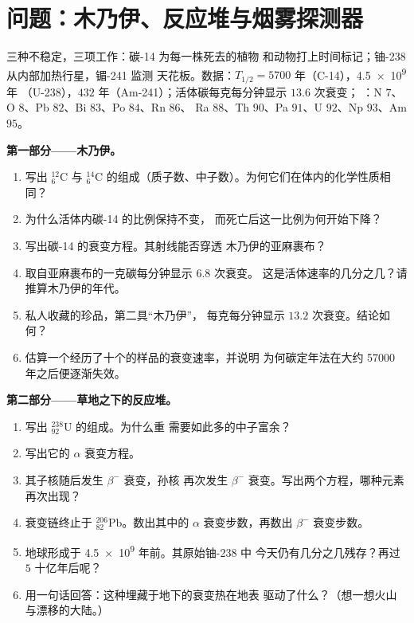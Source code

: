 \section{问题：木乃伊、反应堆与烟雾探测器}

\begin{problem}
\label{pb:g11:nucleus-radioactivity:1}
三种不稳定，三项工作：碳-14 为每一株死去的植物
和动物打上时间标记；铀-238 从内部加热行星，镅-241 监测
天花板。数据：$T_{1/2} = \num{5700}$ 年（C-14），\num{4.5e9} 年
（U-238），$432$ 年（Am-241）；活体碳每克每分钟显示 $13.6$ 次衰变；
：N $7$、O $8$、Pb $82$、Bi $83$、Po $84$、Rn $86$、
Ra $88$、Th $90$、Pa $91$、U $92$、Np $93$、Am $95$。

\medskip
\noindent\textbf{第一部分——木乃伊。}
\begin{enumerate}
  \item 写出 ${}^{12}_{6}\mathrm{C}$ 与
        ${}^{14}_{6}\mathrm{C}$ 的组成（质子数、中子数）。为何它们在体内的化学性质相同？
  \item 为什么活体内碳-14 的比例保持不变，
        而死亡后这一比例为何开始下降？
  \item 写出碳-14 的衰变方程。其射线能否穿透
        木乃伊的亚麻裹布？
  \item 取自亚麻裹布的一克碳每分钟显示 $6.8$ 次衰变。
        这是活体速率的几分之几？请推算木乃伊的年代。
  \item 私人收藏的珍品，第二具“木乃伊”，
        每克每分钟显示 $13.2$ 次衰变。结论如何？
  \item 估算一个经历了十个的样品的衰变速率，并说明
        为何碳定年法在大约 \num{57000} 年之后便逐渐失效。
\end{enumerate}

\medskip
\noindent\textbf{第二部分——草地之下的反应堆。}
\begin{enumerate}[resume]
  \item 写出 ${}^{238}_{92}\mathrm{U}$ 的组成。为什么重
        需要如此多的中子富余？
  \item 写出它的 $\alpha$ 衰变方程。
  \item 其子核随后发生 $\beta^-$ 衰变，孙核
        再次发生 $\beta^-$ 衰变。写出两个方程，哪种元素再次出现？
  \item 衰变链终止于 ${}^{206}_{82}\mathrm{Pb}$。数出其中的 $\alpha$
        衰变步数，再数出 $\beta^-$ 衰变步数。
  \item 地球形成于 \num{4.5e9} 年前。其原始铀-238 中
        今天仍有几分之几残存？再过 $5$ 十亿年后呢？
  \item 用一句话回答：这种埋藏于地下的衰变热在地表
        驱动了什么？（想一想火山与漂移的大陆。）
\end{enumerate}


\end{problem}
